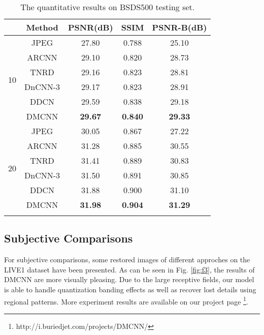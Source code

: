 \documentclass{article}
\begin{document}
\begin{table}[!htb]
  \vspace{-0.2cm}
  \caption{The quantitative results on BSDS500 testing set.}\medskip
  \vspace{-0.1cm}
  \centering
  \begin{tabular}{c|c|c|c|c}
  \Xhline{2\arrayrulewidth}{QF}
  &Method                            &PSNR(dB)       &SSIM           &PSNR-B(dB)    \\ 
  \hline
  \multirow{6}{*}{10}
  &JPEG                              &27.80          &0.788          &25.10         \\ 
  &ARCNN \cite{dong2015compression}  &29.10          &0.820          &28.73         \\
  &TNRD \cite{chen2017trainable}     &29.16          &0.823          &28.81         \\
  &DnCNN-3 \cite{zhang2017beyond}    &29.17          &0.823          &28.91         \\
  &DDCN \cite{guo2016building}       &29.59          &0.838          &29.18         \\
  &DMCNN                             &\textbf{29.67} &\textbf{0.840} &\textbf{29.33}\\
  \hline
  \multirow{6}{*}{20}
  &JPEG                              &30.05          &0.867          &27.22         \\ 
  &ARCNN \cite{dong2015compression}  &31.28          &0.885          &30.55         \\
  &TNRD \cite{chen2017trainable}     &31.41          &0.889          &30.83         \\
  &DnCNN-3 \cite{zhang2017beyond}    &31.50          &0.891          &30.85         \\
  &DDCN \cite{guo2016building}       &31.88          &0.900          &31.10         \\
  &DMCNN                             &\textbf{31.98} &\textbf{0.904} &\textbf{31.29}\\
  \Xhline{2\arrayrulewidth}
  \end{tabular}
  \label{tab:t2}
  \vspace{-0.6cm}
\end{table}
\vspace{-0.2cm}
\subsection{Subjective Comparisons}
\vspace{-0.15cm}
\label{ssec:qual}
For subjective comparisons, some restored images of different approches on
the LIVE1 dataset have been presented. As can be seen in Fig. \ref{fig:f3},
the results of DMCNN are more visually pleasing. Due to the large
receptive fields, our model is able to handle quantization banding effects
as well as recover lost details using regional patterns.
More experiment results are available on our project page
\footnote{http://i.buriedjet.com/projects/DMCNN/}.
\end{document}
